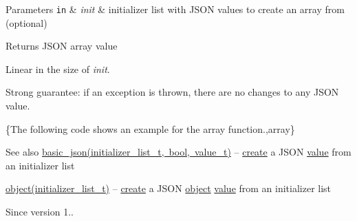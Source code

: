\begin{DoxyParams}[1]{Parameters}
\mbox{\tt in}  & {\em init} & initializer list with J\+S\+ON values to create an array from (optional)\\
\hline
\end{DoxyParams}
\begin{DoxyReturn}{Returns}
J\+S\+ON array value
\end{DoxyReturn}
Linear in the size of {\itshape init}.

Strong guarantee\+: if an exception is thrown, there are no changes to any J\+S\+ON value.

\{The following code shows an example for the {\ttfamily array} function.,array\}

\begin{DoxySeeAlso}{See also}
\mbox{\hyperlink{classnlohmann_1_1basic__json_ab5dfd9a2b2663b219641cb7fe59b6da2}{basic\+\_\+json(initializer\+\_\+list\+\_\+t, bool, value\+\_\+t)}} -- \mbox{\hyperlink{classnlohmann_1_1basic__json_a7b3ddcc9fb62cc378b0d431c430b91af}{create}} a J\+S\+ON \mbox{\hyperlink{classnlohmann_1_1basic__json_adcf8ca5079f5db993820bf50036bf45d}{value}} from an initializer list 

\mbox{\hyperlink{classnlohmann_1_1basic__json_a31f84ee15c4690ff705bed74736d04c6}{object(initializer\+\_\+list\+\_\+t)}} -- \mbox{\hyperlink{classnlohmann_1_1basic__json_a7b3ddcc9fb62cc378b0d431c430b91af}{create}} a J\+S\+ON \mbox{\hyperlink{classnlohmann_1_1basic__json_a31f84ee15c4690ff705bed74736d04c6}{object}} \mbox{\hyperlink{classnlohmann_1_1basic__json_adcf8ca5079f5db993820bf50036bf45d}{value}} from an initializer list
\end{DoxySeeAlso}
\begin{DoxySince}{Since}
version 1.. 
\end{DoxySince}
\mbox{\label{classnlohmann_1_1basic__json_a4a82d3fb7a111641decf35c2fb707c7f}} 
